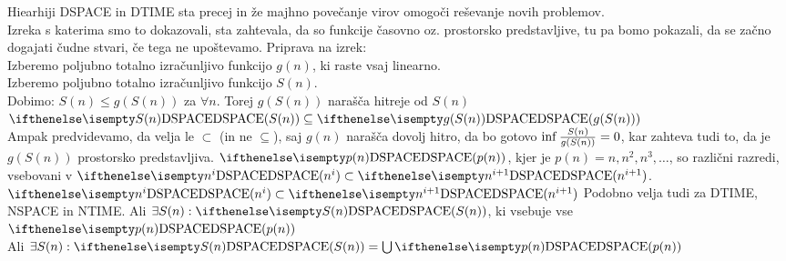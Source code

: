 \documentclass[10pt,a4paper,oneside]{book}
\begin{document}
Hiearhiji DSPACE in DTIME sta precej  in že majhno povečanje virov omogoči reševanje novih problemov.\\%
Izreka s katerima smo to dokazovali, sta zahtevala, da so funkcije časovno oz. prostorsko predstavljive, tu pa bomo pokazali, da se začno dogajati čudne stvari, če tega ne upoštevamo.
\br
Priprava na izrek:\\
Izberemo poljubno totalno izračunljivo funkcijo $g(n)$, ki raste vsaj linearno.\\
Izberemo poljubno totalno izračunljivo funkcijo $S(n)$.\\
Dobimo: $S(n) \leq g(S(n))$ za $\forall n$. Torej $g(S(n))$ narašča hitreje od $S(n)$\\
$\DSPACE{S(n)} \subseteq \DSPACE{g(S(n))}$\\
Ampak predvidevamo, da velja le $\subset$ (in ne $\subseteq$), saj $g(n)$ narašča dovolj hitro, da bo gotovo $\inf {S(n) \over g(S(n))} = 0$, kar zahteva tudi to, da je $g(S(n))$ prostorsko predstavljiva.
$\DSPACE{p(n)}$, kjer je $p(n)=n, n^2, n^3, \dots$, so različni razredi, vsebovani v $\DSPACE{n^i} \subset \DSPACE{n^{i+1}}$.\\
$\DSPACE{n^i} \subset \DSPACE{n^{i+1}}$
Podobno velja tudi za DTIME, NSPACE in NTIME.
\br
Ali $ \exists S(n): \DSPACE{S(n)}$, ki vsebuje vse $\DSPACE{p(n)}$\\
Ali $ \exists S(n): \DSPACE{S(n)} = \bigcup \DSPACE{p(n)}$
\br
{}
\end{document}
